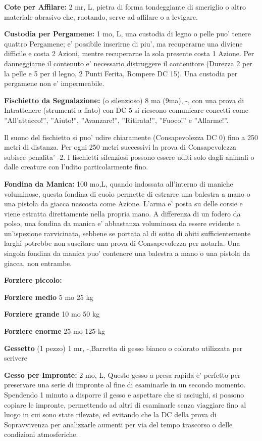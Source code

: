\documentclass[a4paper,11pt,twoside,openany]{book}
\begin{document}
{\textbf{Cote per Affilare:} 2 mr, L, pietra di forma tondeggiante di smeriglio o altro materiale abrasivo che, ruotando, serve ad affilare o a levigare.

\textbf{Custodia per Pergamene:} 1 mo, L, una custodia di legno o pelle puo' tenere quattro Pergamene; e' possibile inserirne di piu', ma recuperarne una diviene difficile e costa 2 Azioni, mentre recuperarne la sola presente costa 1 Azione. Per danneggiarne il contenuto e' necessario distruggere il contenitore (Durezza 2 per la pelle e 5 per il legno, 2 Punti Ferita, Rompere DC 15). Una custodia per pergamene non e' impermeabile.

\textbf{Fischietto da Segnalazione:} (o silenzioso) 8 ma (9ma), -, con una prova di Intrattenere (strumenti a fiato) con DC 5 si riescono comunicare concetti come ''All'attacco!'', ''Aiuto!'', ''Avanzare!'', ''Ritirata!'', ''Fuoco!'' e ''Allarme!''.

Il suono del fischietto si puo' udire chiaramente (Consapevolezza DC 0) fino a 250 metri di distanza. Per ogni 250 metri successivi la prova di Consapevolezza subisce penalita' -2. I fischietti silenziosi possono essere uditi solo dagli animali o dalle creature con l'udito particolarmente fino.

\textbf{Fondina da Manica:} 100 mo,L, quando indossata all'interno di maniche voluminose, questa fondina di cuoio permette di estrarre una balestra a mano o una pistola da giacca nascosta come Azione. L'arma e' posta su delle corsie e viene estratta direttamente nella propria mano.
A differenza di un fodero da polso, una fondina da manica e' abbastanza voluminosa da essere evidente a un'ispezione ravvicinata, sebbene se portata al di sotto di abiti sufficientemente larghi potrebbe non suscitare una prova di Consapevolezza per notarla. Una singola fondina da manica puo' contenere una balestra a mano o una pistola da giacca, non entrambe.

\textbf{Forziere piccolo:}

\textbf{Forziere medio} 5 mo 25 kg

\textbf{Forziere grande} 10 mo 50 kg

\textbf{Forziere enorme} 25 mo 125 kg

\textbf{Gessetto} (1 pezzo) 1 mr, -,Barretta di gesso bianco o colorato utilizzata per scrivere

\textbf{Gesso per Impronte:} 2 mo, L, Questo gesso a presa rapida e' perfetto per preservare una serie di impronte al fine di esaminarle in un secondo momento. Spendendo 1 minuto a disporre il gesso e aspettare che si asciughi, si possono copiare le impronte, permettendo ad altri di esaminarle senza viaggiare fino al luogo in cui sono state rilevate, ed evitando che la DC della prova di Sopravvivenza per analizzarle aumenti per via del tempo trascorso o delle condizioni atmosferiche. 

}
\end{document}
